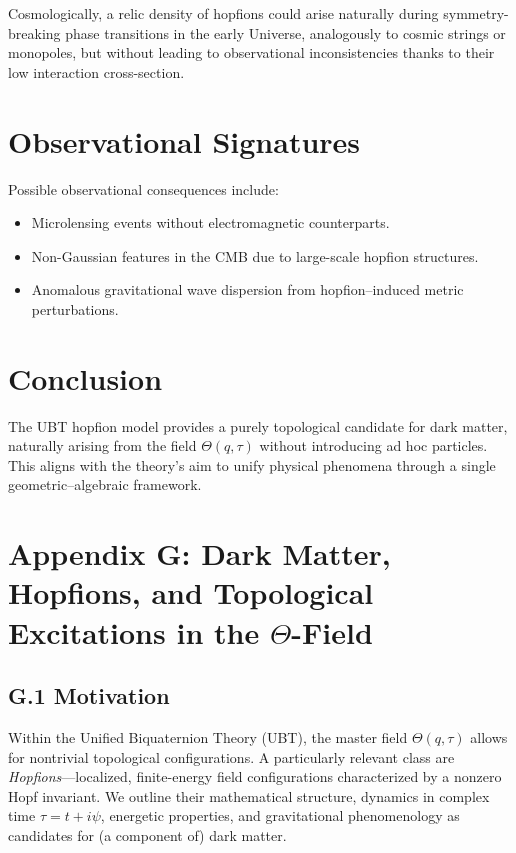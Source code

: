 \documentclass[12pt,a4paper]{article}
\begin{document}
Cosmologically, a relic density of hopfions could arise naturally during symmetry-breaking phase transitions in the early Universe, analogously to cosmic strings or monopoles, but without leading to observational inconsistencies thanks to their low interaction cross-section.

\section*{Observational Signatures}
Possible observational consequences include:
\begin{itemize}
\item Microlensing events without electromagnetic counterparts.
\item Non-Gaussian features in the CMB due to large-scale hopfion structures.
\item Anomalous gravitational wave dispersion from hopfion–induced metric perturbations.
\end{itemize}

\section*{Conclusion}
The UBT hopfion model provides a purely topological candidate for dark matter, naturally arising from the field \(\Theta(q,\tau)\) without introducing ad hoc particles. This aligns with the theory’s aim to unify physical phenomena through a single geometric–algebraic framework.

\section{Appendix G: Dark Matter, Hopfions, and Topological Excitations in the $\Theta$-Field}
\subsection*{G.1 Motivation}
Within the Unified Biquaternion Theory (UBT), the master field $\Theta(q,\tau)$ allows for nontrivial topological configurations. 
A particularly relevant class are \emph{Hopfions}---localized, finite-energy field configurations characterized by a nonzero Hopf invariant. 
We outline their mathematical structure, dynamics in complex time $\tau=t+i\psi$, energetic properties, and gravitational phenomenology as candidates for (a component of) dark matter.
\end{document}
